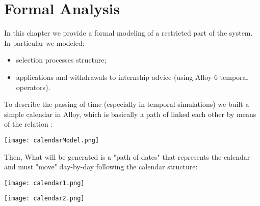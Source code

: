 \chapter{Formal Analysis}
	In this chapter we provide a formal modeling of a restricted part of the system. In particular we modeled:
	\begin{itemize}
		\item selection processes structure;
		\item applications and withdrawals to internship advice (using Alloy 6 temporal operators).
	\end{itemize}
	
	To describe the passing of time (especially in temporal simulations) we built a simple calendar in Alloy, which is basically a path of  linked each other by means of the relation :
	\begin{center}
		\texttt{[image: calendarModel.png]}
	\end{center}
	
	Then, What will be generated is a "path of dates" that represents the calendar and  must "move" day-by-day following the calendar structure:
	\begin{center}
		\texttt{[image: calendar1.png]}
	\end{center}
	\begin{center}
		\texttt{[image: calendar2.png]}
	\end{center}
	

